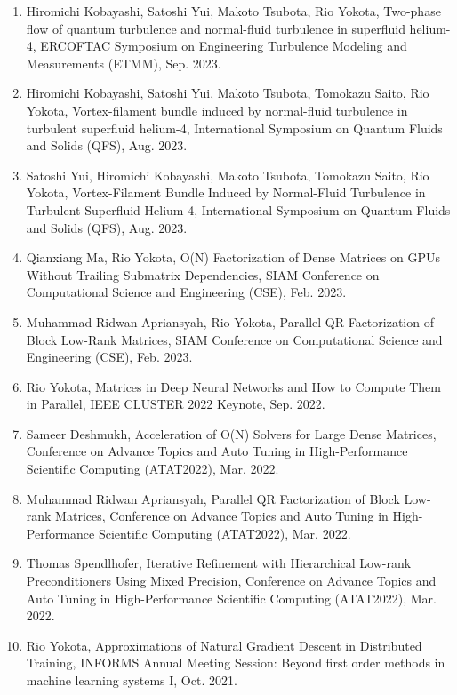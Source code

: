 \documentclass[margin,line]{cv}
\begin{document}
\begin{resume}
\begin{enumerate}
\item Hiromichi Kobayashi, Satoshi Yui, Makoto Tsubota, Rio Yokota, Two-phase flow of quantum turbulence and normal-fluid turbulence in superfluid helium-4, ERCOFTAC Symposium on Engineering Turbulence Modeling and Measurements (ETMM), Sep. 2023.

\item Hiromichi Kobayashi, Satoshi Yui, Makoto Tsubota, Tomokazu Saito, Rio Yokota, Vortex-filament bundle induced by normal-fluid turbulence in turbulent superfluid helium-4, International Symposium on Quantum Fluids and Solids (QFS), Aug. 2023.

\item Satoshi Yui, Hiromichi Kobayashi, Makoto Tsubota, Tomokazu Saito, Rio Yokota, Vortex-Filament Bundle Induced by Normal-Fluid Turbulence in Turbulent Superfluid Helium-4, International Symposium on Quantum Fluids and Solids (QFS), Aug. 2023.

\item Qianxiang Ma, Rio Yokota, O(N) Factorization of Dense Matrices on GPUs Without Trailing Submatrix Dependencies, SIAM Conference on Computational Science and Engineering (CSE), Feb. 2023.

\item Muhammad Ridwan Apriansyah, Rio Yokota, Parallel QR Factorization of Block Low-Rank Matrices, SIAM Conference on Computational Science and Engineering (CSE), Feb. 2023.

\item Rio Yokota, Matrices in Deep Neural Networks and How to Compute Them in Parallel, IEEE CLUSTER 2022 Keynote, Sep. 2022.

\item Sameer Deshmukh, Acceleration of O(N) Solvers for Large Dense Matrices, Conference on Advance Topics and Auto Tuning in High-Performance Scientific Computing (ATAT2022), Mar. 2022.

\item Muhammad Ridwan Apriansyah, Parallel QR Factorization of Block Low-rank Matrices,  Conference on Advance Topics and Auto Tuning in High-Performance Scientific Computing (ATAT2022), Mar. 2022.

\item Thomas Spendlhofer, Iterative Refinement with Hierarchical Low-rank Preconditioners Using Mixed Precision, Conference on Advance Topics and Auto Tuning in High-Performance Scientific Computing (ATAT2022), Mar. 2022.

\item Rio Yokota, Approximations of Natural Gradient Descent in Distributed Training, INFORMS Annual Meeting Session: Beyond first order methods in machine learning systems I, Oct. 2021.


\end{enumerate}
\end{resume}
\end{document}
